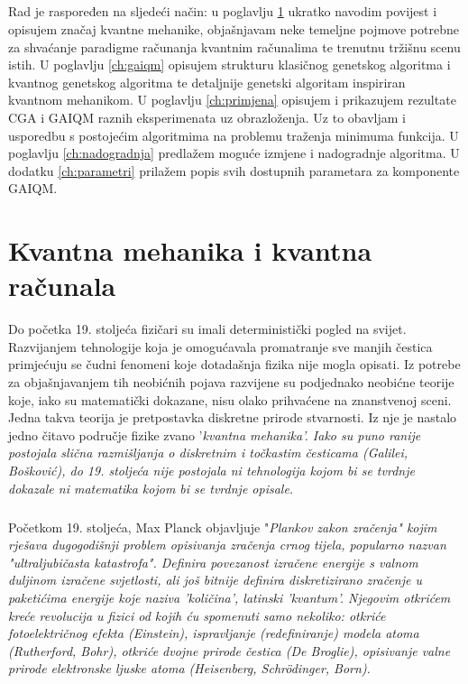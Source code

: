 \documentclass[times, utf8, zavrsni, numeric]{fer}
\begin{document}
\paragraph{}
Rad je raspoređen na sljedeći način: u poglavlju \ref{ch:kvameh} ukratko navodim povijest i opisujem značaj kvantne mehanike, objašnjavam neke temeljne pojmove potrebne za shvaćanje paradigme računanja kvantnim računalima te trenutnu tržišnu scenu istih. U poglavlju \ref{ch:gaiqm} opisujem strukturu klasičnog genetskog algoritma i kvantnog genetskog algoritma te detaljnije genetski algoritam inspiriran kvantnom mehanikom. U poglavlju \ref{ch:primjena} opisujem i prikazujem rezultate CGA i GAIQM raznih eksperimenata uz obrazloženja. Uz to obavljam i usporedbu s postojećim algoritmima na problemu traženja minimuma funkcija. U poglavlju \ref{ch:nadogradnja} predlažem moguće izmjene i nadogradnje algoritma. U dodatku \ref{ch:parametri} prilažem popis svih dostupnih parametara za komponente GAIQM.

\chapter{Kvantna mehanika i kvantna računala}
\label{ch:kvameh}
Do početka 19. stoljeća fizičari su imali deterministički pogled na svijet. Razvijanjem tehnologije koja je omogućavala promatranje sve manjih čestica primjećuju se čudni fenomeni koje dotadašnja fizika nije mogla opisati. Iz potrebe za objašnjavanjem tih neobićnih pojava razvijene su podjednako neobićne teorije koje, iako su matematički dokazane, nisu olako prihvaćene na znanstvenoj sceni. Jedna takva teorija je pretpostavka diskretne prirode stvarnosti. Iz nje je nastalo jedno čitavo područje fizike zvano '\it kvantna mehanika\rm '. Iako su puno ranije postojala slična razmišljanja o diskretnim i točkastim česticama (Galilei, Bošković), do 19. stoljeća nije postojala ni tehnologija kojom bi se tvrdnje dokazale ni matematika kojom bi se tvrdnje opisale.

\paragraph{}
Početkom 19. stoljeća, Max Planck objavljuje "\it Plankov zakon zračenja\rm" kojim rješava dugogodišnji problem opisivanja zračenja crnog tijela, popularno nazvan "\it ultraljubičasta katastrofa\rm". Definira povezanost izračene energije s valnom duljinom izračene svjetlosti, ali još bitnije definira diskretizirano zračenje u paketićima energije koje naziva 'količina', latinski 'kvantum'. Njegovim otkrićem kreće revolucija u fizici od kojih ću spomenuti samo nekoliko: otkriće fotoelektričnog efekta (Einstein), ispravljanje (redefiniranje) modela atoma (Rutherford, Bohr), otkriće dvojne prirode čestica (De Broglie), opisivanje valne prirode elektronske ljuske atoma (Heisenberg, Schr\"odinger, Born). \citep{bozja_cestica}
\end{document}
